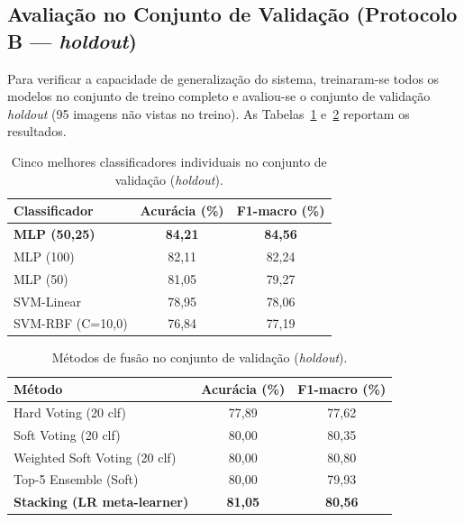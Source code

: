 \documentclass[12pt]{article}
\begin{document}
\subsection{Avaliação no Conjunto de Validação (Protocolo B --- \textit{holdout})}

Para verificar a capacidade de generalização do sistema, treinaram-se todos os
modelos no conjunto de treino completo e avaliou-se o conjunto de validação
\textit{holdout} (95 imagens não vistas no treino). As Tabelas~\ref{tab:ind-val}
e~\ref{tab:fusao-val} reportam os resultados.

\begin{table}[H]
\centering
\caption{Cinco melhores classificadores individuais no conjunto de validação
(\textit{holdout}).}
\label{tab:ind-val}
\begin{tabular}{lcc}
\toprule
Classificador & Acurácia (\%) & F1-macro (\%) \\
\midrule
\textbf{MLP (50,25)}   & \textbf{84,21} & \textbf{84,56} \\
MLP (100)              & 82,11 & 82,24 \\
MLP (50)               & 81,05 & 79,27 \\
SVM-Linear             & 78,95 & 78,06 \\
SVM-RBF (C=10,0)       & 76,84 & 77,19 \\
\bottomrule
\end{tabular}
\end{table}

\begin{table}[H]
\centering
\caption{Métodos de fusão no conjunto de validação (\textit{holdout}).}
\label{tab:fusao-val}
\begin{tabular}{lcc}
\toprule
Método & Acurácia (\%) & F1-macro (\%) \\
\midrule
Hard Voting (20 clf)          & 77,89 & 77,62 \\
Soft Voting (20 clf)          & 80,00 & 80,35 \\
Weighted Soft Voting (20 clf) & 80,00 & 80,80 \\
Top-5 Ensemble (Soft)         & 80,00 & 79,93 \\
\textbf{Stacking (LR meta-learner)} & \textbf{81,05} & \textbf{80,56} \\
\bottomrule
\end{tabular}
\end{table}
\end{document}

